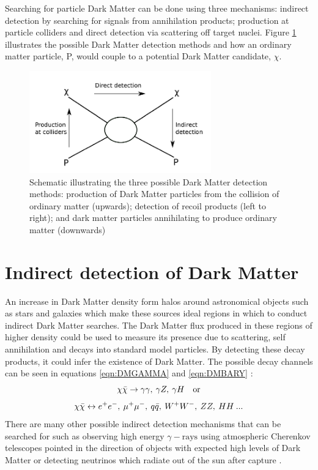 Searching for particle Dark Matter can be done using three mechanisms: indirect detection by searching for signals from annihilation products; production at particle colliders and direct detection via scattering off target nuclei. Figure \ref{fig:detection_schem} illustrates the possible Dark Matter detection methods and how an ordinary matter particle, P, would couple to a potential Dark Matter candidate, $\chi$.
\begin{figure}[h]
    \centering
    \includegraphics[width=0.7\textwidth]{Figures/Detection_schematic.png}
    \caption{Schematic illustrating the three possible Dark Matter detection methods: production of Dark Matter particles from the collision of ordinary matter (upwards); detection of recoil products (left to right); and dark matter particles annihilating to produce ordinary matter (downwards) \cite{DirectDetection2015}}
    \label{fig:detection_schem}
\end{figure}
\section{Indirect detection of Dark Matter}\label{sec:indirect}
An increase in Dark Matter density form halos around astronomical objects such as stars and galaxies which make these sources ideal regions in which to conduct indirect Dark Matter searches. The Dark Matter flux produced in these regions of higher density could be used to measure its presence due to scattering, self annihilation and decays into standard model particles. By detecting these decay products, it could infer the existence of Dark Matter. The possible decay channels can be seen in equations \ref{eqn:DMGAMMA} and \ref{eqn:DMBARY} \cite{DMProd}:
\begin{equation}\label{eqn:DMGAMMA}
    \chi\Bar{\chi} \rightarrow \gamma\gamma,\: \gamma Z,\: \gamma H \quad \textrm{or}
\end{equation}
\begin{equation}\label{eqn:DMBARY}
    \chi\Bar{\chi} \leftrightarrow e^+e^-,\: \mu^+\mu^-,\: q\Bar{q},\: W^+W^-,\: ZZ,\: HH\: ...
\end{equation}
There are many other possible indirect detection mechanisms that can be searched for such as observing high energy $\gamma-\textrm{rays}$ using atmospheric Cherenkov telescopes pointed in the direction of objects with expected high levels of Dark Matter or detecting neutrinos which radiate out of the sun after capture \cite{DirectDetection2015}. 

